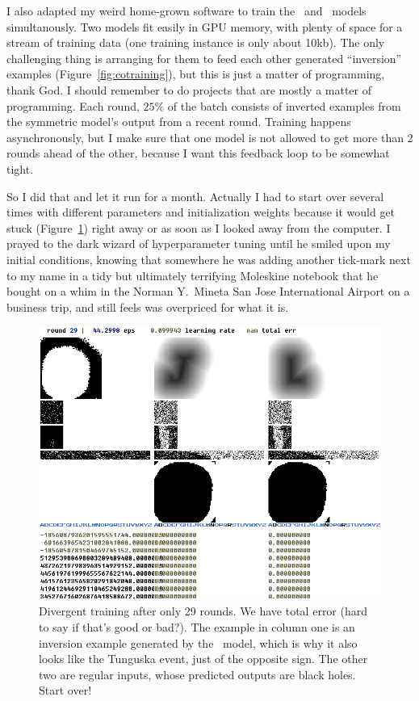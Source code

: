 \documentclass[twocolumn]{article}
\begin{document}
I also adapted my weird home-grown software to train the
\makeuppercase\ and \makelowercase\ models simultanously. Two models
fit easily in GPU memory, with plenty of space for a stream of
training data (one training instance is only about 10kb). The only
challenging thing is arranging for them to feed each other generated
``inversion'' examples (Figure~\ref{fig:cotraining}), but this is just
a matter of programming, thank God. I should remember to do projects
that are mostly a matter of programming. Each round, $25\%$ of the
batch consists of inverted examples from the symmetric model's output
from a recent round. Training happens asynchronously, but I make sure
that one model is not allowed to get more than 2 rounds ahead of the
other, because I want this feedback loop to be somewhat tight.

So I did that and let it run for a month. Actually I had to start over
several times with different parameters and initialization weights
because it would get stuck (Figure~\ref{fig:nans}) right away or as
soon as I looked away from the computer. I prayed to the dark wizard
of hyperparameter tuning until he smiled upon my initial conditions,
knowing that somewhere he was adding another tick-mark next to my name
in a tidy but ultimately terrifying Moleskine notebook that he bought
on a whim in the Norman Y.~Mineta San Jose International Airport on a
business trip, and still feels was overpriced for what it is.

\begin{figure}[ht]
\centering
  \includegraphics[width=0.9 \linewidth]{nans}
\caption{ Divergent training after only 29 rounds. We have \nan{}
  total error (hard to say if that's good or bad?). The example in
  column one is an inversion example generated by the
  \makeuppercase\ model, which is why it also looks like the Tunguska
  event, just of the opposite sign. The other two are regular inputs,
  whose predicted outputs are black holes. Start over!
} \label{fig:nans}
\end{figure}
\end{document}
